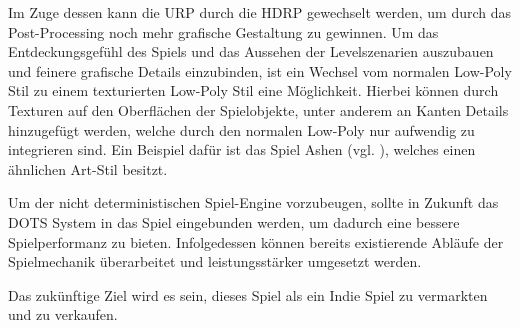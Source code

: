 Im Zuge dessen kann die \ac{URP} durch die \ac{HDRP} gewechselt werden, um durch das Post-Processing noch mehr grafische Gestaltung zu gewinnen. Um das Entdeckungsgefühl des Spiels und das Aussehen der Levelszenarien auszubauen und feinere grafische Details einzubinden, ist ein Wechsel vom normalen Low-Poly Stil zu einem texturierten Low-Poly Stil eine Möglichkeit. Hierbei können durch Texturen auf den Oberflächen der Spielobjekte, unter anderem an Kanten Details hinzugefügt werden, welche durch den normalen Low-Poly nur aufwendig zu integrieren sind. Ein Beispiel dafür ist das Spiel Ashen (vgl. \cite{gamestar_ashen_2023}), welches einen ähnlichen Art-Stil besitzt.

Um der nicht deterministischen Spiel-Engine vorzubeugen, sollte in Zukunft das \ac{DOTS} System in das Spiel eingebunden werden, um dadurch eine bessere Spielperformanz zu bieten. Infolgedessen können bereits existierende Abläufe der Spielmechanik überarbeitet und leistungsstärker umgesetzt werden.

Das zukünftige Ziel wird es sein, dieses Spiel als ein Indie Spiel zu vermarkten und zu verkaufen.
